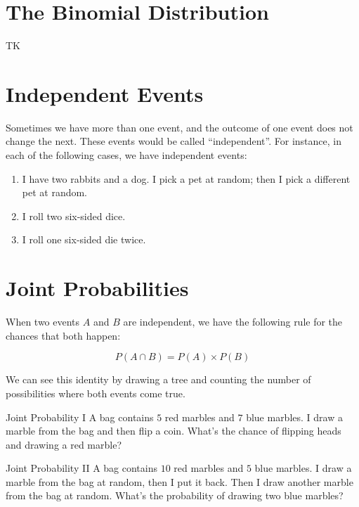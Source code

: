 \documentclass[a4paper,10pt]{report}
\begin{document}
\section{The Binomial Distribution}

TK

\section{Independent Events}

Sometimes we have more than one event, and the outcome of one event does not
change the next. These events would be called ``independent''. For instance,
in each of the following cases, we have independent events:

\begin{enumerate}
 \item I have two rabbits and a dog. I pick a pet at random; then I pick a
 different pet at random.
 \item I roll two six-sided dice.
 \item I roll one six-sided die twice.
\end{enumerate}

\section{Joint Probabilities}

When two events $A$ and $B$ are independent, we have the following rule for the
chances that both happen:

\begin{equation}
 P(A \cap B) = P(A) \times P(B)
\end{equation}

We can see this identity by drawing a tree and counting the number of
possibilities where both events come true.

\begin{problem}{Joint Probability I}
 A bag contains $5$ red marbles and $7$ blue marbles. I draw a marble from the
 bag and then flip a coin. What's the chance of flipping heads and drawing a red
 marble?
\end{problem}

\begin{problem}{Joint Probability II}
 A bag contains $10$ red marbles and $5$ blue marbles. I draw a marble from the
 bag at random, then I put it back. Then I draw another marble from the bag at
 random. What's the probability of drawing two blue marbles?
\end{problem}
\end{document}
